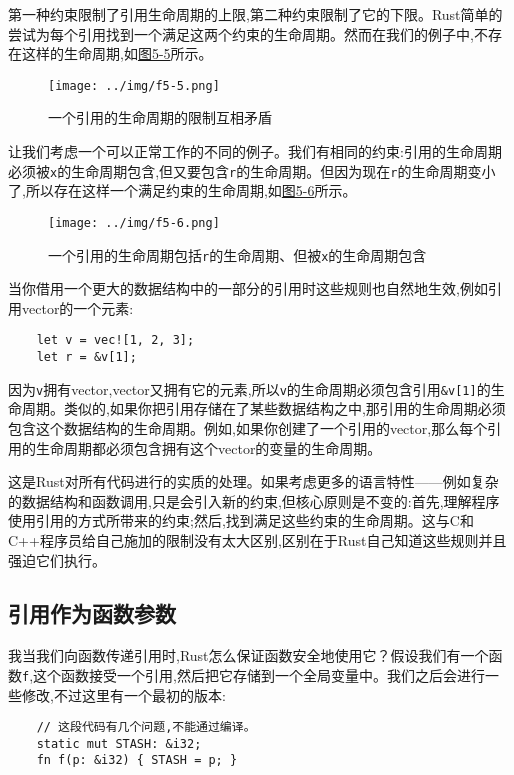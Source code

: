 第一种约束限制了引用生命周期的上限,第二种约束限制了它的下限。Rust简单的尝试为每个引用找到一个满足这两个约束的生命周期。然而在我们的例子中,不存在这样的生命周期,如\hyperref[f5-5]{图5-5}所示。

\begin{figure}[htbp]
    \centering
    \texttt{[image: ../img/f5-5.png]}
    \caption{一个引用的生命周期的限制互相矛盾}
    \label{f5-5}
\end{figure}

让我们考虑一个可以正常工作的不同的例子。我们有相同的约束:引用的生命周期必须被\texttt{x}的生命周期包含,但又要包含\texttt{r}的生命周期。但因为现在\texttt{r}的生命周期变小了,所以存在这样一个满足约束的生命周期,如\hyperref[f5-6]{图5-6}所示。

\begin{figure}[htbp]
    \centering
    \texttt{[image: ../img/f5-6.png]}
    \caption{一个引用的生命周期包括\texttt{r}的生命周期、但被\texttt{x}的生命周期包含}
    \label{f5-6}
\end{figure}

当你借用一个更大的数据结构中的一部分的引用时这些规则也自然地生效,例如引用vector的一个元素:
\begin{verbatim}
    let v = vec![1, 2, 3];
    let r = &v[1];
\end{verbatim}

因为\texttt{v}拥有vector,vector又拥有它的元素,所以\texttt{v}的生命周期必须包含引用\texttt{\&v[1]}的生命周期。类似的,如果你把引用存储在了某些数据结构之中,那引用的生命周期必须包含这个数据结构的生命周期。例如,如果你创建了一个引用的vector,那么每个引用的生命周期都必须包含拥有这个vector的变量的生命周期。

这是Rust对所有代码进行的实质的处理。如果考虑更多的语言特性——例如复杂的数据结构和函数调用,只是会引入新的约束,但核心原则是不变的:首先,理解程序使用引用的方式所带来的约束;然后,找到满足这些约束的生命周期。这与C和C++程序员给自己施加的限制没有太大区别,区别在于Rust自己知道这些规则并且强迫它们执行。

\subsection{引用作为函数参数}\label{RefAsArg}

我当我们向函数传递引用时,Rust怎么保证函数安全地使用它？假设我们有一个函数\texttt{f},这个函数接受一个引用,然后把它存储到一个全局变量中。我们之后会进行一些修改,不过这里有一个最初的版本:
\begin{verbatim}
    // 这段代码有几个问题,不能通过编译。
    static mut STASH: &i32;
    fn f(p: &i32) { STASH = p; }
\end{verbatim}

